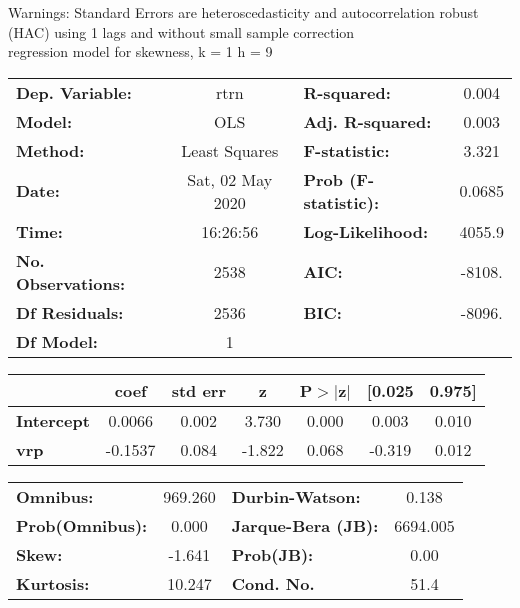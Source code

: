 Warnings: \newline
 [1] Standard Errors are heteroscedasticity and autocorrelation robust (HAC) using 1 lags and without small sample correction\\ 

regression model for skewness, k = 1 h = 9\begin{center}
\begin{tabular}{lclc}
\toprule
\textbf{Dep. Variable:}    &       rtrn       & \textbf{  R-squared:         } &     0.004   \\
\textbf{Model:}            &       OLS        & \textbf{  Adj. R-squared:    } &     0.003   \\
\textbf{Method:}           &  Least Squares   & \textbf{  F-statistic:       } &     3.321   \\
\textbf{Date:}             & Sat, 02 May 2020 & \textbf{  Prob (F-statistic):} &   0.0685    \\
\textbf{Time:}             &     16:26:56     & \textbf{  Log-Likelihood:    } &    4055.9   \\
\textbf{No. Observations:} &        2538      & \textbf{  AIC:               } &    -8108.   \\
\textbf{Df Residuals:}     &        2536      & \textbf{  BIC:               } &    -8096.   \\
\textbf{Df Model:}         &           1      & \textbf{                     } &             \\
\bottomrule
\end{tabular}
\begin{tabular}{lcccccc}
                   & \textbf{coef} & \textbf{std err} & \textbf{z} & \textbf{P$> |$z$|$} & \textbf{[0.025} & \textbf{0.975]}  \\
\midrule
\textbf{Intercept} &       0.0066  &        0.002     &     3.730  &         0.000        &        0.003    &        0.010     \\
\textbf{vrp}       &      -0.1537  &        0.084     &    -1.822  &         0.068        &       -0.319    &        0.012     \\
\bottomrule
\end{tabular}
\begin{tabular}{lclc}
\textbf{Omnibus:}       & 969.260 & \textbf{  Durbin-Watson:     } &    0.138  \\
\textbf{Prob(Omnibus):} &   0.000 & \textbf{  Jarque-Bera (JB):  } & 6694.005  \\
\textbf{Skew:}          &  -1.641 & \textbf{  Prob(JB):          } &     0.00  \\
\textbf{Kurtosis:}      &  10.247 & \textbf{  Cond. No.          } &     51.4  \\
\bottomrule
\end{tabular}
\end{center}


